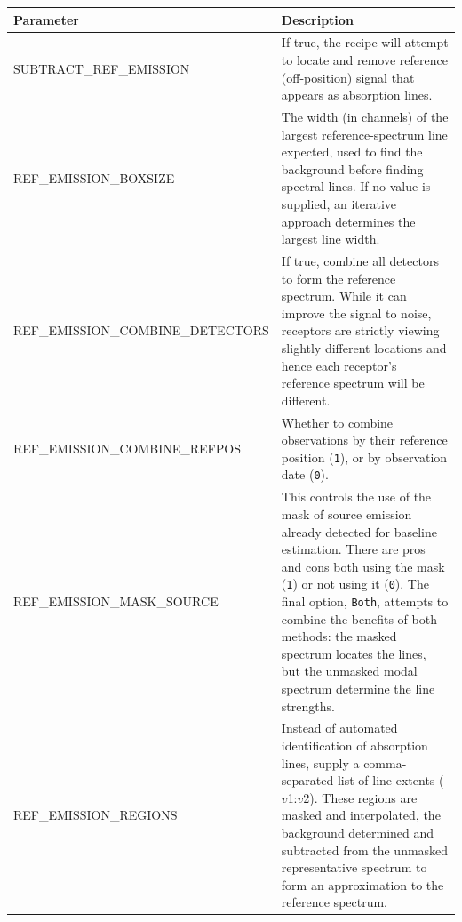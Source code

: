 \documentclass[11pt,oneside,chapters]{starlink}
\begin{document}
\begin{table}[h!]
\begin{small}
\begin{tabular}{|p{6.8cm}|p{8.6cm}|}
\hline
\textbf{Parameter} & \textbf{Description} \\
\hline

SUBTRACT\_REF\_EMISSION & If true, the recipe will attempt to locate and
                           remove reference (off-position) signal that
                           appears as absorption lines. \\

REF\_EMISSION\_BOXSIZE & The width (in channels) of the largest reference-spectrum line
                         expected, used to find the background before finding spectral
                         lines.  If no value is supplied, an iterative approach determines
                         the largest line width. \smallskip  \\

REF\_EMISSION\_COMBINE\_DETECTORS & If true, combine all detectors to form the
                                    reference spectrum.  While it can improve the
                                    signal to noise, receptors are strictly viewing
                                    slightly different locations and hence each
                                    receptor's reference spectrum will be different.  \\

REF\_EMISSION\_COMBINE\_REFPOS & Whether to combine observations by their
                                 reference position (\texttt{1}), or by observation date
                                 (\texttt{0}). \\

REF\_EMISSION\_MASK\_SOURCE & This controls the use of the mask of source emission
                              already detected for baseline estimation.  There are pros
                              and cons both using the mask (\texttt{1}) or not using it (\texttt{0}).
                              The final option, \texttt{Both}, attempts to combine the benefits of
                              both methods: the masked spectrum locates the lines, but the unmasked
                              modal spectrum determine the line strengths. \\

REF\_EMISSION\_REGIONS & Instead of automated identification of absorption lines, supply
                         a comma-separated list of line extents ($v$1:$v$2).  These regions
                         are masked and interpolated, the background determined and subtracted
                         from the unmasked representative spectrum to form an approximation to
                         the reference spectrum. \\


\end{tabular}
\end{small}
\end{table}
\end{document}
